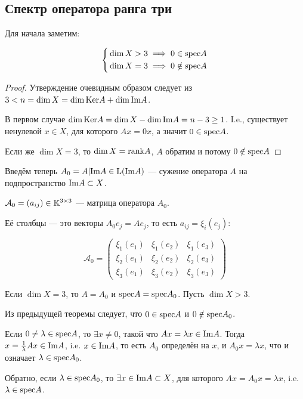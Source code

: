 \subsection{Спектр оператора ранга три}
Для начала заметим:
\begin{thm}
  $$\left\{\begin{aligned}
    & \dim X > 3 \implies 0\in \mathrm{spec} A \\
    & \dim X = 3 \implies 0\notin \mathrm{spec} A\end{aligned}\right.$$
\end{thm}
\begin{proof}
  Утверждение очевидным образом
  следует из $3 < n = \dim X = \dim\mathrm{Ker} A + \dim\mathrm{Im} A$.

  В первом случае $\dim\mathrm{Ker} A = \dim X - \dim\mathrm{Im} A = n - 3 \geq 1$.
  I.e., существует ненулевой  $x\in X$, для которого $A x = 0 x$, а значит $0\in\mathrm{spec} A$.

  Если же $\dim X = 3$, то $\dim X = \mathrm{rank} A$, $A$ обратим и потому $0\notin\mathrm{spec} A$
\end{proof}

Введём теперь $A_0 = A|\mathrm{Im} A \in \mathrm{L}(\mathrm{Im} A)$
--- сужение оператора $A$ на подпространство $\mathrm{Im} A\subset X$.

$\mathcal A_0 = \left(a_{ij}\right) \in \mathbb{K}^{3\times 3}$ --- матрица оператора $A_0$.

Её столбцы --- это векторы $A_0 e_j  = A e_j$, то есть $a_{ij} = \xi_i(e_j)$:

$$\mathcal A_0 =
\begin{pmatrix}
\xi_1(e_1) & \xi_1(e_2) & \xi_1(e_3) \\
\xi_2(e_1) & \xi_2(e_2) & \xi_2(e_3) \\
\xi_3(e_1) & \xi_3(e_2) & \xi_3(e_3)
\end{pmatrix}$$

Если $\dim X = 3$, то $A = A_0$ и $\mathrm{spec} A = \mathrm{spec} A_0$.
Пусть $\dim X > 3$.

Из предыдущей теоремы следует,
что $0\in\mathrm{spec} A$ и $0\notin\mathrm{spec} A_0$.

Если $0\neq\lambda\in\mathrm{spec} A$, то $\exists x\neq 0$,
такой что $A x = \lambda x \in \mathrm{Im} A$.
Тогда $x = \frac{1}{\lambda} A x\in\mathrm{Im} A$, i.e. $x\in \mathrm{Im} A$,
то есть $A_0$ определён на $x$,
и $A_0 x = \lambda x$, что и означает $\lambda\in\mathrm{spec} A_0$.

Обратно, если $\lambda\in\mathrm{spec} A_0$,
то $\exists x\in\mathrm{Im} A\subset X$,
для которого $A x = A_0 x = \lambda x$,
i.e. $\lambda\in\mathrm{spec} A$.

